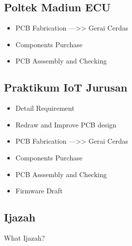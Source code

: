 \documentclass{article} %
\begin{document}
\subsection{Poltek Madiun ECU}

\begin{itemize}
    \item PCB Fabrication --->> Gerai Cerdas
    \item Components Purchase
    \item PCB Asssembly and Checking
\end{itemize}

\subsection{Praktikum IoT Jurusan}

\begin{itemize}
    \item Detail Requirement
    \item Redraw and Improve PCB design
    \item PCB Fabrication --->> Gerai Cerdas
    \item Components Purchase
    \item PCB Asssembly and Checking
    \item Firmware Draft
\end{itemize}

\subsection{Ijazah}

What Ijazah?
\end{document}
